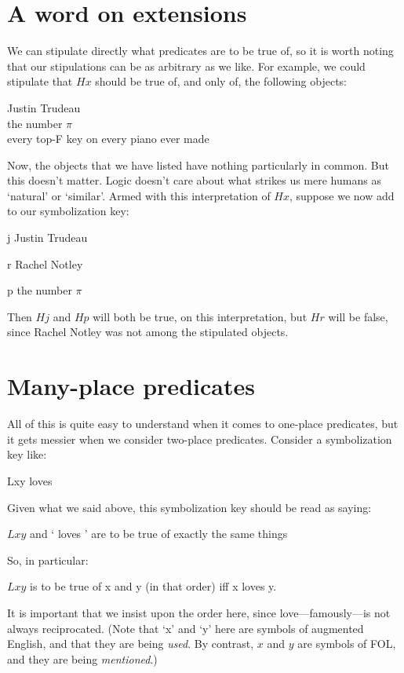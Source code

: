 \section{A word on extensions}
We can stipulate directly what predicates are to be true of, so it is worth noting that our stipulations can be as arbitrary as we like. For example, we could stipulate that $Hx$ should be true of, and only of, the following objects:
	\begin{center}
		Justin Trudeau\\
		the number $\pi$\\
		every top-F key on every piano ever made
	\end{center}
Now, the objects that we have listed have nothing particularly in common. But this doesn't matter. Logic doesn't care about what strikes us mere humans as `natural' or `similar'. Armed with this interpretation of $Hx$, suppose we now add to our symbolization key:
	\begin{ekey}
		\item[j] Justin Trudeau
		\item[r] Rachel Notley
		\item[p] the number $\pi$
	\end{ekey}
Then $Hj$ and $Hp$ will both be true, on this interpretation, but $Hr$ will be false, since Rachel Notley was not among the stipulated objects. 



\section{Many-place predicates}
All of this is quite easy to understand when it comes to one-place predicates, but it gets messier when we consider two-place predicates. Consider a symbolization key like:
	\begin{ekey}
		\item[Lxy]  loves 
	\end{ekey}
Given what we said above, this symbolization key should be read as saying:
	\begin{earg}
		\item[\textbullet] $Lxy$ and ` loves ' are to be true of exactly the same things
	\end{earg}
So, in particular:
	\begin{earg}
		\item[\textbullet] $Lxy$ is to be true of x and y (in that order) iff x loves y. 
	\end{earg}
It is important that we insist upon the order here, since love---famously---is not always reciprocated. (Note that `x' and `y' here are symbols of augmented English, and that they are being \emph{used}. By contrast, $x$ and $y$ are symbols of FOL, and they are being \emph{mentioned}.)

